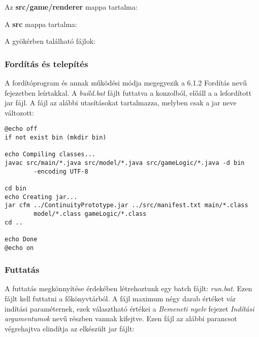 Az \textbf{src/game/renderer} mappa tartalma:
\begin{filelist}
\end{filelist}

A \textbf{src} mappa tartalma:
\begin{filelist}
\end{filelist}


A gyökérben található fájlok:
\begin{filelist}
\end{filelist}

\newpage

\subsubsection{Fordítás és telepítés}
A fordítóprogram és annak működési módja megegyezik a 6.1.2 Fordítás nevű fejezetben leírtakkal. A \emph{build.bat} fájlt futtatva a konzolból, előáll a a lefordított jar fájl. A fájl az alábbi utasításokat tartalmazza, melyben csak a jar neve változott:

\begin{verbatim}
@echo off
if not exist bin (mkdir bin)

echo Compiling classes...
javac src/main/*.java src/model/*.java src/gameLogic/*.java -d bin
        -encoding UTF-8

cd bin
echo Creating jar...
jar cfm ../ContinuityPrototype.jar ../src/manifest.txt main/*.class
        model/*.class gameLogic/*.class
cd ..

echo Done
@echo on
\end{verbatim}

\subsubsection{Futtatás}
A futtatás megkönnyítése érdekében létrehoztunk egy batch fájlt: \emph{run.bat}. Ezen fájlt kell futtatni a főkönyvtárból. A fájl maximum négy darab értéket vár indítási paraméternek, ezek választható értékei a \emph{Bemeneti nyelv} fejezet \emph{Indítási argumentumok} nevű részben vannak kifejtve. Ezen fájl az alábbi parancsot végrehajtva elindítja az elkészült jar fájlt: 

